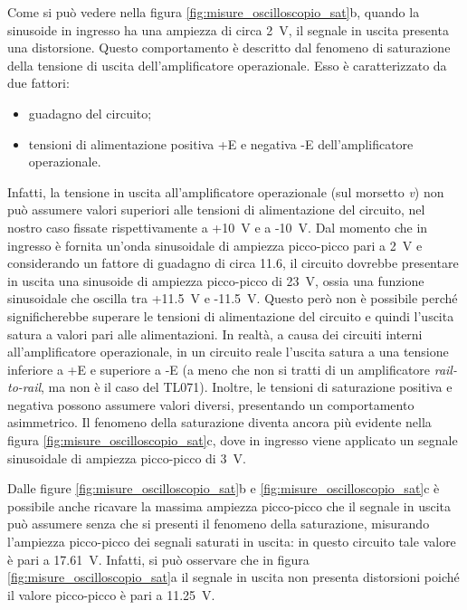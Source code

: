 \newpage
\noindent
Come si può vedere nella figura \ref{fig:misure_oscilloscopio_sat}b, quando la sinusoide in ingresso ha una ampiezza di circa \SI{2}{\volt}, il segnale in uscita presenta una distorsione. Questo comportamento è descritto dal fenomeno di saturazione della tensione di uscita dell'amplificatore operazionale. Esso è caratterizzato da due fattori:
\begin{itemize}
	\item guadagno del circuito;
	\item tensioni di alimentazione positiva +E e negativa -E dell'amplificatore operazionale.
\end{itemize} 
Infatti, la tensione in uscita all'amplificatore operazionale (sul morsetto \textit{v}) non può assumere valori superiori alle tensioni di alimentazione del circuito, nel nostro caso fissate rispettivamente a +\SI{10}{\volt} e a -\SI{10}{\volt}. Dal momento che in ingresso è fornita un'onda sinusoidale di ampiezza picco-picco pari a \SI{2}{\volt} e considerando un fattore di guadagno di circa 11.6, il circuito dovrebbe presentare in uscita una sinusoide di ampiezza picco-picco di \SI{23}{\volt}, ossia una funzione sinusoidale che oscilla tra +\SI{11.5}{\volt} e -\SI{11.5}{\volt}. Questo però non è possibile perché significherebbe superare le tensioni di alimentazione del circuito e quindi l'uscita satura a valori pari alle alimentazioni. In realtà, a causa dei circuiti interni all'amplificatore operazionale, in un circuito reale l'uscita satura a una tensione inferiore a +E e superiore a -E (a meno che non si tratti di un amplificatore \textit{rail-to-rail}, ma non è il caso del TL071). Inoltre, le tensioni di saturazione positiva e negativa possono assumere valori diversi, presentando un comportamento asimmetrico. Il fenomeno della saturazione diventa ancora più evidente nella figura \ref{fig:misure_oscilloscopio_sat}c, dove in ingresso viene applicato un segnale sinusoidale di ampiezza picco-picco di \SI{3}{\volt}.

\noindent
Dalle figure \ref{fig:misure_oscilloscopio_sat}b e \ref{fig:misure_oscilloscopio_sat}c  è possibile anche ricavare la massima ampiezza picco-picco che il segnale in uscita può assumere senza che si presenti il fenomeno della saturazione, misurando l'ampiezza picco-picco dei segnali saturati in uscita: in questo circuito tale valore è pari a \SI{17.61}{\volt}. Infatti, si può osservare che in figura \ref{fig:misure_oscilloscopio_sat}a il segnale in uscita non presenta distorsioni poiché il valore picco-picco è pari a \SI{11.25}{\volt}. 

